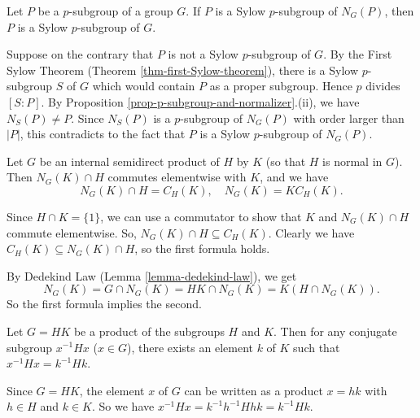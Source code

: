 \begin{lemma} \label{lemma-Sylow-in-normalizer-implies-Sylow-in-G}
	Let $P$ be a $p$-subgroup of a group $G$. If $P$ is a Sylow $p$-subgroup of $N_G(P)$, then $P$ is a Sylow $p$-subgroup of $G$.
\end{lemma}
\begin{sketch}
	Suppose on the contrary that $P$ is not a Sylow $p$-subgroup of $G$. By the First Sylow Theorem (Theorem \ref{thm-first-Sylow-theorem}), there is a Sylow $p$-subgroup $S$ of $G$ which would contain $P$ as a proper subgroup. Hence $p$ divides $[S:P]$. By Proposition \ref{prop-p-subgroup-and-normalizer}.(ii), we have $N_S(P) \neq P$. Since $N_S(P)$ is a $p$-subgroup of $N_G(P)$ with order larger than $|P|$, this contradicts to the fact that $P$ is a Sylow $p$-subgroup of $N_G(P)$.
\end{sketch}
\begin{lemma} \label{lemma-semidirect-prod-C-and-N}
	Let $G$ be an internal semidirect product of $H$ by $K$ (so that $H$ is normal in $G$). Then $N_G(K) \cap H$ commutes elementwise with $K$, and we have
	$$N_G(K) \cap H = C_H(K), \quad N_G(K) = KC_H(K).$$
\end{lemma}
\begin{sketch}
	Since $H \cap K = \{1\}$, we can use a commutator to show that $K$ and $N_G(K) \cap H$ commute elementwise. So, $N_G(K) \cap H \subseteq C_H(K)$. Clearly we have
	$C_H(K) \subseteq N_G(K) \cap H$,
	so the first formula holds.
	
	By Dedekind Law (Lemma \ref{lemma-dedekind-law}), we get
	$$N_G(K) = G \cap N_G(K) = HK \cap N_G(K) = K(H \cap N_G(K)).$$
	So the first formula implies the second.
\end{sketch}

\begin{lemma} \label{lemma-HK-and-conjugate}
	Let $G = HK$ be a product of the subgroups $H$ and $K$. Then for any conjugate subgroup $x^{-1}Hx$ ($x\in G$), there exists an element $k$ of $K$ such that $x^{-1}Hx = k^{-1}Hk$.
\end{lemma}
\begin{sketch}
	Since $G = HK$, the element $x$ of $G$ can be written as a product $x = hk$ with $h\in H$ and $k\in K$. So we have
	$x^{-1}Hx = k^{-1}h^{-1}Hhk = k^{-1}Hk$.
\end{sketch}

